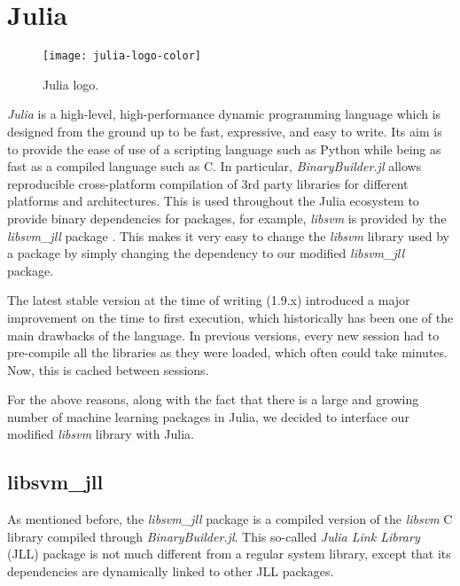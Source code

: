 \section{Julia}%
\label{sub:impl_julia}

\begin{wrapfigure}{r}{.40\textwidth}
    \texttt{[image: julia-logo-color]}
    \caption{Julia logo.\protect\footnotemark}
    \label{fig:julia_logo}
\end{wrapfigure}

\emph{Julia} \cite{bezanson2017julia} is a high-level, high-performance dynamic programming language
which is designed from the ground up to be fast, expressive, and easy to write. Its aim is to provide
the ease of use of a scripting language such as Python while being as fast as a compiled language
such as C. In particular, \emph{BinaryBuilder.jl} \cite{JLLPackagesBinaryBuilder} allows reproducible
cross-platform compilation of 3rd party libraries for different platforms and architectures.
This is used throughout the Julia ecosystem to provide binary dependencies for packages,
for example, \emph{libsvm} is provided by the \emph{libsvm\_jll} package \cite{LibsvmJllJl2022}.
This makes it very easy to change the \emph{libsvm} library used by a package by simply changing
the dependency to our modified \emph{libsvm\_jll} package.

The latest stable version at the time of writing (1.9.x) introduced a major improvement on the
time to first execution, which historically has been one of the main drawbacks of the language.
In previous versions, every new session had to pre-compile all the libraries as they were loaded,
which often could take minutes. Now, this is cached between sessions\cite{JuliaV1Release}.

For the above reasons, along with the fact that there is a large and growing number of machine learning
packages in Julia, we decided to interface our modified \emph{libsvm} library with Julia.

\subsection{libsvm\_jll}

As mentioned before, the \emph{libsvm\_jll} package is a compiled version of the \emph{libsvm} C library
compiled through \emph{BinaryBuilder.jl}. This so-called \emph{Julia Link Library} (JLL) package
is not much different from a regular system library, except that its dependencies are dynamically
linked to other JLL packages.

